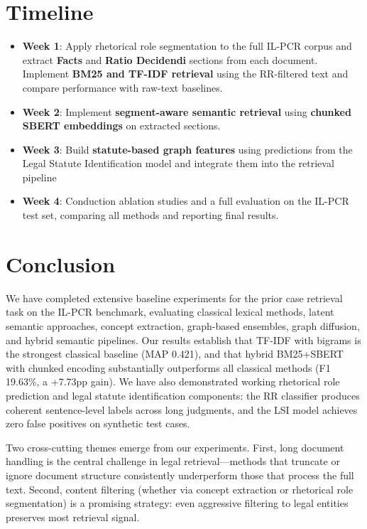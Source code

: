 \documentclass[11pt]{article}
\begin{document}
\section{Timeline}
\begin{itemize}
    \item \textbf{Week 1}: Apply rhetorical role segmentation to the full IL-PCR corpus and extract \textbf{Facts} and \textbf{Ratio Decidendi} sections from each document. Implement \textbf{BM25 and TF-IDF retrieval} using the RR-filtered text and compare performance with raw-text baselines.
    \item \textbf{Week 2}: Implement \textbf{segment-aware semantic retrieval} using \textbf{chunked SBERT embeddings} on extracted sections.
    \item \textbf{Week 3}: Build \textbf{statute-based graph features} using predictions from the Legal Statute Identification model and integrate them into the retrieval pipeline
    \item \textbf{Week 4}: Conduction ablation studies and a full evaluation on the IL-PCR test set, comparing all methods and reporting final results.
\end{itemize}

\section{Conclusion}

We have completed extensive baseline experiments for the prior case retrieval task on the IL-PCR benchmark, evaluating classical lexical methods, latent semantic approaches, concept extraction, graph-based ensembles, graph diffusion, and hybrid semantic pipelines.
Our results establish that TF-IDF with bigrams is the strongest classical baseline (MAP 0.421), and that hybrid BM25+SBERT with chunked encoding substantially outperforms all classical methods (F1 19.63\%, a +7.73pp gain).
We have also demonstrated working rhetorical role prediction and legal statute identification components: the RR classifier produces coherent sentence-level labels across long judgments, and the LSI model achieves zero false positives on synthetic test cases.

Two cross-cutting themes emerge from our experiments.
First, long document handling is the central challenge in legal retrieval---methods that truncate or ignore document structure consistently underperform those that process the full text.
Second, content filtering (whether via concept extraction or rhetorical role segmentation) is a promising strategy: even aggressive filtering to legal entities preserves most retrieval signal.
\end{document}
